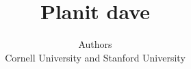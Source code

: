\documentclass[letterpaper, 10 pt, conference]{ieeeconf}  %
\begin{document}
\title{Planit dave}

\author{Authors\\
Cornell University and Stanford University\\}


\maketitle
\maketitle

\IEEEpeerreviewmaketitle

















{


}
\end{document}
